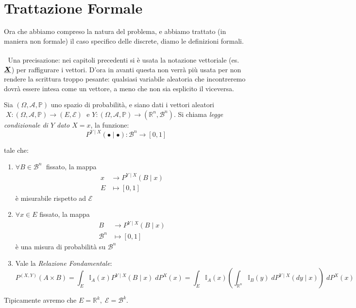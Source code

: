 \section{Trattazione Formale}
\noindent Ora che abbiamo compreso la natura del problema, e abbiamo trattato (in maniera non formale) il caso specifico delle discrete, diamo le definizioni formali.\\
\\
\faWarning $\;$ Una precisazione: nei capitoli precedenti si è usata la notazione vettoriale (es. $\underline{{\boldsymbol{X}}}$) per raffigurare i vettori. D'ora in avanti questa non verrà più usata per non rendere la scrittura troppo pesante: qualsiasi variabile aleatoria che incontreremo dovrà essere intesa come un vettore, a meno che non sia esplicito il viceversa.

\begin{definizione}
\label{def:legge_cond}
    Sia $(\Omega, \mathcal{A}, \mathbb{P})$ uno spazio di probabilità, e siano dati i vettori aleatori $\;X:(\Omega, \mathcal{A}, \mathbb{P})\to (E, \mathcal{E})\;$ e $Y:(\Omega, \mathcal{A}, \mathbb{P})\to (\mathbb{R}^n, \mathcal{B}^n)$. Si chiama \textit{legge condizionale di $Y$ dato $X=x$}, la funzione:
    \[P^{Y\mid X}(\bullet\mid\bullet): \mathcal{B}^n\longrightarrow[0, 1]\]

    tale che:
    \begin{enumerate}
        \item $\forall B\in\mathcal{B}^n\;$ fissato, la mappa
        \begin{align*}
            x &\longrightarrow P^{Y\mid X}(B\mid x)\\
            E &\longmapsto[0, 1]
        \end{align*}
        è misurabile rispetto ad $\mathcal{E}$
        
        \item $\forall x\in E$ fissato, la mappa 
        \begin{align*}
            B &\longrightarrow P^{Y\mid X}(B\mid x)\\
            \mathcal{B}^n &\longmapsto[0, 1]
        \end{align*}
        è una misura di probabilità su $\mathcal{B}^n$
        
        \item Vale la \textit{Relazione Fondamentale}:
        \[\boxed{P^{(X, Y)} (A\times B)= \int_E\mathbb{I}_A(x) P^{Y\mid X}(B\mid x)\; dP^X(x) = \int_E\mathbb{I}_A(x)\left(\int_{\mathbb{R} ^n}\mathbb{I}_B(y)\; dP^{Y\mid X}(dy\mid x)\right)\;dP^X(x)}\]
    \end{enumerate}
\end{definizione}
Tipicamente avremo che $E = \mathbb{R}^k, \;\mathcal{E} = \mathcal{B}^k$.

